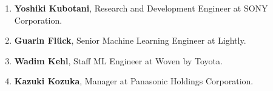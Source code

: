 \documentclass{article}
\begin{document}
\begin{enumerate}
    \item {\bf Yoshiki Kubotani}, Research and Development Engineer at SONY Corporation.

    \item {\bf Guarin Flück}, Senior Machine Learning Engineer at Lightly.

    \item {\bf Wadim Kehl}, Staff ML Engineer at Woven by Toyota.

    \item {\bf Kazuki Kozuka}, Manager at Panasonic Holdings Corporation.
\end{enumerate}
\end{document}
